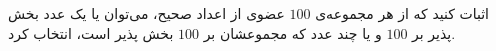 \p
اثبات کنید که از هر مجموعه‌ی 
$100$
عضوی از اعداد صحیح، می‌توان یا یک عدد بخش پذیر بر
$100$
و یا چند عدد که مجموعشان بر
$100$
بخش پذیر است، انتخاب کرد.